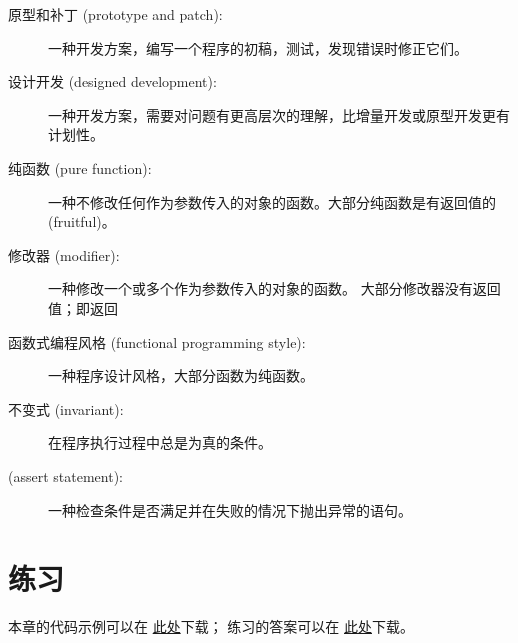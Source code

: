 {\begin{description}

\item[原型和补丁 (prototype and patch):]
一种开发方案，编写一个程序的初稿，测试，发现错误时修正它们。

\item[设计开发 (designed development):]
一种开发方案，需要对问题有更高层次的理解，比增量开发或原型开发更有计划性。

\item[纯函数 (pure function):] 一种不修改任何作为参数传入的对象的函数。大部分纯函数是有返回值的(fruitful)。

\item[修改器 (modifier):]
一种修改一个或多个作为参数传入的对象的函数。
大部分修改器没有返回值；即返回 

\item[函数式编程风格 (functional programming style):]
一种程序设计风格，大部分函数为纯函数。

\item[不变式 (invariant):]
在程序执行过程中总是为真的条件。

\item[(assert statement):]
一种检查条件是否满足并在失败的情况下抛出异常的语句。
  

\end{description}

\section{练习}

本章的代码示例可以在 \href{http://thinkpython2.com/code/Time1.py}{此处}下载；
练习的答案可以在 \href{http://thinkpython2.com/code/Time1_soln.py}{此处}下载。

\begin{exercise}



\end{exercise}}

